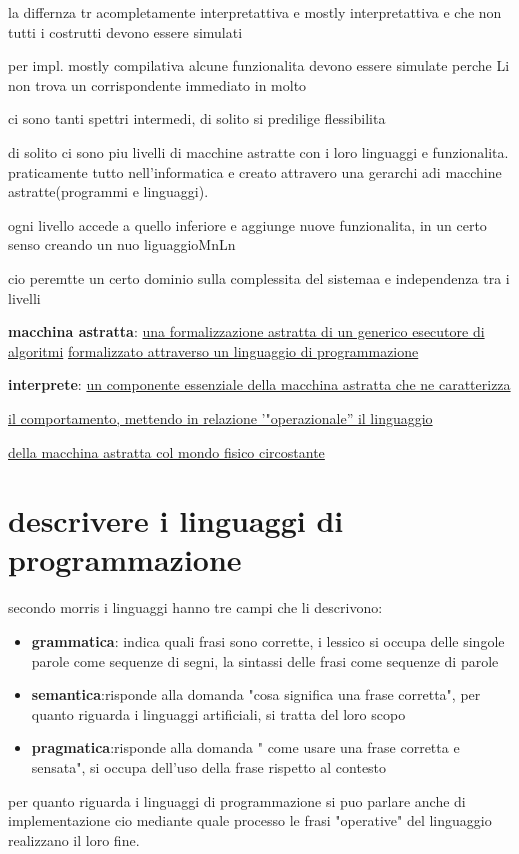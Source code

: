 \documentclass[12pt]{article}
\begin{document}
la differnza tr acompletamente interpretattiva e mostly interpretattiva e che non tutti i costrutti devono essere simulati

per impl. mostly compilativa alcune funzionalita devono essere simulate perche Li non trova un corrispondente immediato in molto

ci sono tanti spettri intermedi, di solito si predilige flessibilita

di solito ci sono piu livelli di macchine astratte con i loro linguaggi e funzionalita.
praticamente tutto nell'informatica e creato attravero una gerarchi adi macchine astratte(programmi e linguaggi).

ogni livello accede a quello inferiore e aggiunge nuove funzionalita, in un certo senso creando un nuo liguaggioMnLn

cio peremtte un certo dominio sulla complessita del sistemaa e independenza tra i livelli

\textbf{macchina astratta}:
\underline{una formalizzazione astratta di un generico esecutore di algoritmi}
\underline{formalizzato attraverso un linguaggio di programmazione}

\textbf{interprete}:
\underline{un componente essenziale della macchina astratta che ne caratterizza}

\underline{ il comportamento, mettendo in relazione '"operazionale'' il linguaggio}

\underline{della macchina astratta col mondo fisico circostante}

\section{descrivere i linguaggi di programmazione}

secondo morris i linguaggi hanno tre campi che li descrivono:
\begin{itemize}
    \item \textbf{grammatica}: indica quali frasi sono corrette, i lessico si occupa delle singole parole come sequenze di segni, la sintassi delle frasi come sequenze di parole
    \item \textbf{semantica}:risponde alla domanda "cosa significa una frase corretta", per quanto riguarda i linguaggi artificiali, si tratta del loro scopo
    \item \textbf{pragmatica}:risponde alla domanda " come usare una frase corretta e sensata", si occupa dell'uso della frase rispetto al contesto
\end{itemize}
per quanto riguarda i linguaggi di programmazione si puo parlare anche di implementazione cio mediante quale processo le frasi "operative" del linguaggio realizzano il loro fine.
\end{document}
